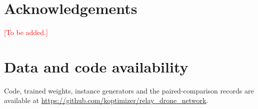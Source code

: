 \documentclass[final,5p,times,twocolumn]{elsarticle}
\newcommand{\pending}[1]{\textcolor{red}{[#1]}}
\begin{document}
\section*{Acknowledgements}
\pending{To be added.}

\section*{Data and code availability}
Code, trained weights, instance generators and the paired-comparison records are available at
\url{https://github.com/koptimizer/relay_drone_network}.



\end{document}
